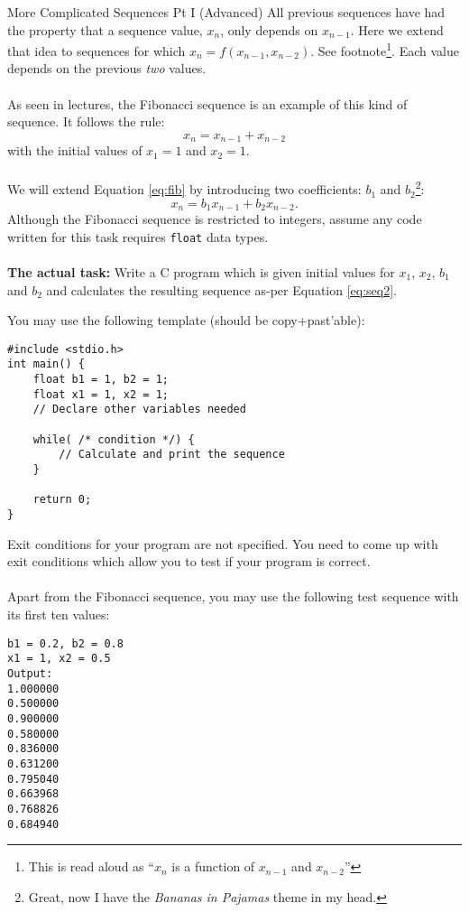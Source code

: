 \documentclass{lab}
\begin{document}
\begin{task}{More Complicated Sequences Pt I (Advanced)}{}
All previous sequences have had the property that a sequence value, $x_n$, only depends on $x_{n-1}$. Here we extend that idea to sequences for which $x_n = f(x_{n-1}, x_{n-2})$. See footnote\footnote{This is read aloud as ``$x_n$ is a function of $x_{n-1}$ and $x_{n-2}$''}. Each value depends on the previous \textit{two} values.
\\ \\
As seen in lectures, the Fibonacci sequence is an example of this kind of sequence. It follows the rule:
\begin{equation}\label{eq:fib}
x_n = x_{n-1} + x_{n-2}
\end{equation}
with the initial values of $x_1 = 1$ and $x_2 = 1$.
\\ \\
We will extend Equation \eqref{eq:fib} by introducing two coefficients: $b_1$ and $b_2$\footnote{Great, now I have the \textit{Bananas in Pajamas} theme in my head.}:
\begin{equation}\label{eq:seq2}
x_n = b_1x_{n-1} + b_2x_{n-2}.
\end{equation}
Although the Fibonacci sequence is restricted to integers, assume any code written for this task requires \texttt{float} data types.
\\ \\
\textbf{The actual task:} Write a C program which is given initial values for $x_1$, $x_2$, $b_1$ and $b_2$ and calculates the resulting sequence as-per Equation \eqref{eq:seq2}.

You may use the following template (should be copy+past'able):
\begin{lstlisting}[style=pseudo]
#include <stdio.h>
int main() {
	float b1 = 1, b2 = 1;
	float x1 = 1, x2 = 1;
	// Declare other variables needed
		
	while( /* condition */) {
		// Calculate and print the sequence
	}	
	
	return 0;
}
\end{lstlisting}
Exit conditions for your program are not specified. You need to come up with exit conditions which allow you to test if your program is correct.
\\ \\
Apart from the Fibonacci sequence, you may use the following test sequence with its first ten values:
\begin{lstlisting}[style=pseudo]
b1 = 0.2, b2 = 0.8
x1 = 1, x2 = 0.5
Output:
1.000000
0.500000
0.900000
0.580000
0.836000
0.631200
0.795040
0.663968
0.768826
0.684940
\end{lstlisting}
\end{task}
\end{document}
